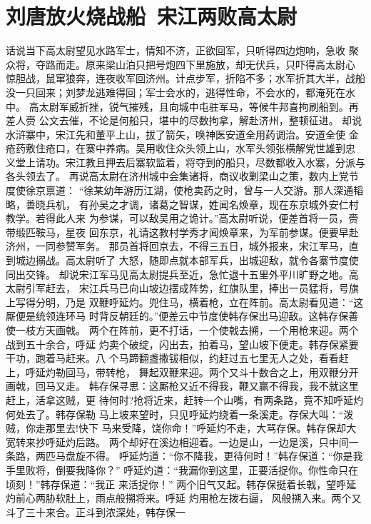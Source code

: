 \chapter{刘唐放火烧战船~宋江两败高太尉}

话说当下高太尉望见水路军士，情知不济，正欲回军，只听得四边炮响，急收
聚众将，夺路而走。原来梁山泊只把号炮四下里施放，却无伏兵，只吓得高太尉心
惊胆战，鼠窜狼奔，连夜收军回济州。计点步军，折陷不多；水军折其大半，战船
没一只回来；刘梦龙逃难得回；军士会水的，逃得性命，不会水的，都淹死在水中。
高太尉军威折挫，锐气摧残，且向城中屯驻军马，等候牛邦喜拘刷船到。再差人赍
公文去催，不论是何船只，堪中的尽数拘拿，解赴济州，整顿征进。
却说水浒寨中，宋江先和董平上山，拔了箭矢，唤神医安道全用药调治。安道全使
金疮药敷住疮口，在寨中养病。吴用收住众头领上山，水军头领张横解党世雄到忠
义堂上请功。宋江教且押去后寨软监着，将夺到的船只，尽数都收入水寨，分派与
各头领去了。
再说高太尉在济州城中会集诸将，商议收剿梁山之策，数内上党节度使徐京禀道：
“徐某幼年游历江湖，使枪卖药之时，曾与一人交游。那人深通韬略，善晓兵机，
有孙吴之才调，诸葛之智谋，姓闻名焕章，现在东京城外安仁村教学。若得此人来
为参谋，可以敌吴用之诡计。”高太尉听说，便差首将一员，赍带缎匹鞍马，星夜
回东京，礼请这教村学秀才闻焕章来，为军前参谋。便要早赴济州，一同参赞军务。
那员首将回京去，不得三五日，城外报来，宋江军马，直到城边搦战。高太尉听了
大怒，随即点就本部军兵，出城迎敌，就令各寨节度使同出交锋。
却说宋江军马见高太尉提兵至近，急忙退十五里外平川旷野之地。高太尉引军赶去，
宋江兵马已向山坡边摆成阵势，红旗队里，捧出一员猛将，号旗上写得分明，乃是
双鞭呼延灼。兜住马，横着枪，立在阵前。高太尉看见道：“这厮便是统领连环马
时背反朝廷的。”便差云中节度使韩存保出马迎敌。这韩存保善使一枝方天画戟。
两个在阵前，更不打话，一个使戟去搠，一个用枪来迎。两个战到五十余合，呼延
灼卖个破绽，闪出去，拍着马，望山坡下便走。韩存保紧要干功，跑着马赶来。八
个马蹄翻盏撒钹相似，约赶过五七里无人之处，看看赶上，呼延灼勒回马，带转枪，
舞起双鞭来迎。两个又斗十数合之上，用双鞭分开画戟，回马又走。
韩存保寻思：这厮枪又近不得我，鞭又赢不得我，我不就这里赶上，活拿这贼，更
待何时?抢将近来，赶转一个山嘴，有两条路，竟不知呼延灼何处去了。韩存保勒
马上坡来望时，只见呼延灼绕着一条溪走。存保大叫：“泼贼，你走那里去!快下
马来受降，饶你命！”呼延灼不走，大骂存保。韩存保却大宽转来抄呼延灼后路。
两个却好在溪边相迎着。一边是山，一边是溪，只中间一条路，两匹马盘旋不得。
呼延灼道：“你不降我，更待何时！”韩存保道：“你是我手里败将，倒要我降你？”
呼延灼道：“我漏你到这里，正要活捉你。你性命只在顷刻！”韩存保道：“我正
来活捉你！”
两个旧气又起。韩存保挺着长戟，望呼延灼前心两胁软肚上，雨点般搠将来。呼延
灼用枪左拨右逼，风般搠入来。两个又斗了三十来合。正斗到浓深处，韩存保一
